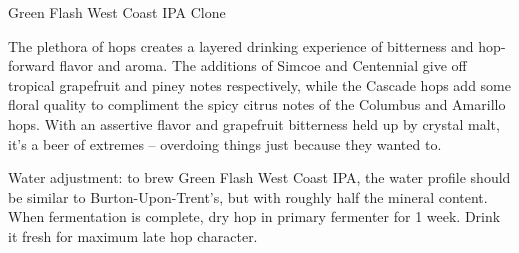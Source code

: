 \begin{recipie}{Green Flash West Coast IPA Clone}

\begin{aboutblock}
The plethora of hops creates a layered drinking experience of bitterness and
hop-forward flavor and aroma. The additions of Simcoe and Centennial give off
tropical grapefruit and piney notes respectively, while the Cascade hops add some
floral quality to compliment the spicy citrus notes of the Columbus and Amarillo
hops. With an assertive flavor and grapefruit bitterness held up by crystal malt,
it's a beer of extremes -- overdoing things just because they wanted to.
\end{aboutblock}


\begin{methodandtiming}
 
\begin{mashsteps}
\end{mashsteps}

\begin{fermentationsteps}
\end{fermentationsteps}

\begin{directions}
Water adjustment: to brew Green Flash West Coast IPA, the water profile should
be similar to Burton-Upon-Trent's, but with roughly half the mineral content.
When fermentation is complete, dry hop in primary fermenter for 1 week.
Drink it fresh for maximum late hop character.
\end{directions}

\end{methodandtiming}

\pagebreak

\begin{ingredientsblock}

\begin{malts}
\end{malts}


\end{ingredientsblock}
\end{recipie}
